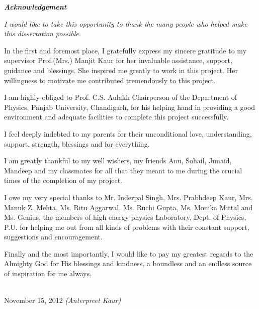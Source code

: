 \thispagestyle{empty}
\begin{center}
{\large \bf{\em Acknowledgement}}
\end{center}
\vspace*{0.5cm}
{ \em
I would like to take this opportunity to thank the many people who helped make this dissertation possible.

In the first and foremost place, I gratefully express my sincere gratitude to my supervisor Prof.(Mrs.) Manjit Kaur for her invaluable assistance, support, guidance and blessings. She inspired me greatly to work in this project. Her willingness to motivate me contributed tremendously to this project. 

I am highly obliged to Prof. C.S. Aulakh Chairperson of the Department of Physics, Panjab University, Chandigarh, for his helping hand in providing a good environment and adequate facilities to complete this project successfully.

I feel deeply indebted to my parents for their unconditional love, understanding, support, strength, blessings and for everything.

I am greatly thankful to my well wishers, my friends Anu, Sohail, Junaid, Mandeep and my classmates for all that they meant to me during the crucial times of the completion of my project.

I owe my very special thanks to Mr. Inderpal Singh, Mrs. Prabhdeep Kaur, Mrs. Manuk Z. Mehta, Ms. Ritu Aggarwal, Ms. Ruchi Gupta, Ms. Monika Mittal and Ms. Genius, the members of high energy physics Laboratory, Dept. of Physics, P.U. for helping me out from all kinds of problems with their constant support, suggestions and encouragement. 

Finally and the most importantly, I would like to pay my greatest regards to the Almighty God for His blessings and kindness, a boundless and an endless source of inspiration for me always.} \\[2cm]
{November 15, 2012} \hspace*{8.cm}
{\em (Anterpreet Kaur)}
